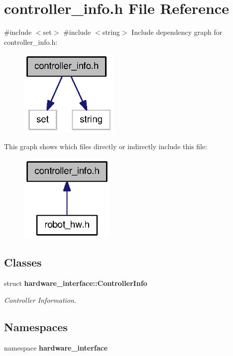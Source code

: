 \section{controller\-\_\-info.\-h \-File \-Reference}
\label{controller__info_8h}
{\ttfamily \#include $<$set$>$}\*
{\ttfamily \#include $<$string$>$}\*
\-Include dependency graph for controller\-\_\-info.\-h\-:
\nopagebreak
\begin{figure}[H]
\begin{center}
\leavevmode
\includegraphics[width=134pt]{controller__info_8h__incl}
\end{center}
\end{figure}
\-This graph shows which files directly or indirectly include this file\-:
\nopagebreak
\begin{figure}[H]
\begin{center}
\leavevmode
\includegraphics[width=130pt]{controller__info_8h__dep__incl}
\end{center}
\end{figure}
\subsection*{\-Classes}
\begin{DoxyCompactItemize}
\item 
struct {\bf hardware\-\_\-interface\-::\-Controller\-Info}
\begin{DoxyCompactList}\small\item\em \-Controller \-Information. \end{DoxyCompactList}\end{DoxyCompactItemize}
\subsection*{\-Namespaces}
\begin{DoxyCompactItemize}
\item 
namespace {\bf hardware\-\_\-interface}
\end{DoxyCompactItemize}
